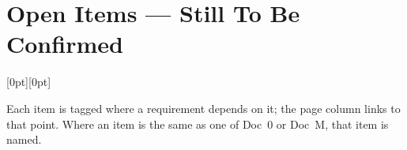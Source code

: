 
\section*{Open Items --- Still To Be Confirmed}
\label{sec:open-items}
\raisebox{0pt}[0pt][0pt]{\hypertarget{openitems}{}}

Each item is tagged \openitemlegend{} where a requirement depends on it; the page
column links to that point. Where an item is the same as one of Doc~0 or Doc~M, that
item is named.

